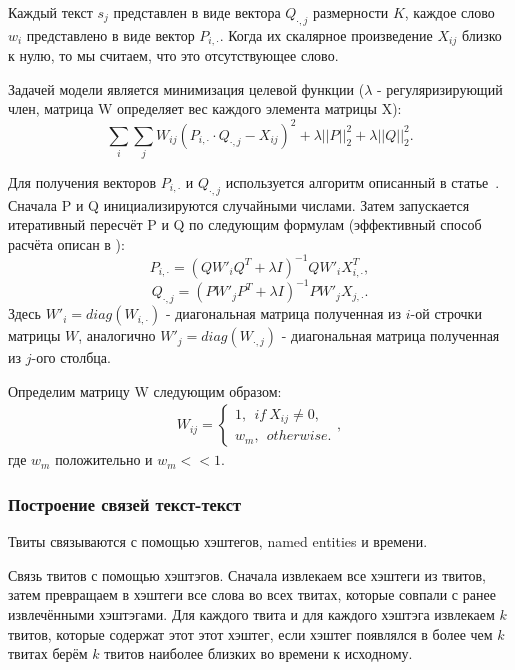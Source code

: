         Каждый текст $s_j$ представлен в виде вектора $Q_{\cdot,j}$ размерности $K$, каждое слово $w_i$ представлено в виде вектор $P_{i,\cdot}$. Когда их скалярное произведение $X_{ij}$ близко к нулю, то мы считаем, что это отсутствующее слово.

        Задачей модели является минимизация целевой функции ({\color{red}$\lambda$ - регуляризирующий член}, матрица W определяет вес каждого элемента матрицы X):
        $$\sum_i \sum_j W_{ij} (P_{i,\cdot} \cdot Q_{\cdot,j} - X_{ij})^2 + \lambda ||P||^2_2 + \lambda ||Q||^2_2.$$

        Для получения векторов $P_{i,\cdot}$ и $Q_{\cdot,j}$ используется алгоритм описанный в статье~\cite{matrix_approximation}. Сначала P и Q инициализируются случайными числами. Затем запускается итеративный пересчёт P и Q по следующим формулам (эффективный способ расчёта описан в \cite{steck_recommender}):
        $$P_{i, \cdot} = (Q W'_i Q^T + \lambda I)^{-1} Q W'_i X_{i,\cdot}^T,$$
        $$Q_{\cdot, j} = (P W'_j P^T + \lambda I)^{-1} P W'_j X_{j,\cdot}.$$
        Здесь $W'_i = diag(W_{i, \cdot})$ - диагональная матрица полученная из $i$-ой строчки матрицы $W$, аналогично $W'_j = diag(W_{\cdot, j})$ - диагональная матрица полученная из $j$-ого столбца.

        Определим матрицу W следующим образом:
        \begin{gather}
            W_{ij} =
            \begin{cases}
                1, ~~if~X_{ij} \neq 0, \nonumber \\
                w_m, ~~otherwise.
            \end{cases},
        \end{gather}
        где $w_m$ положительно и $w_m << 1$.

    \subsubsection{Построение связей текст-текст}
        Твиты связываются с помощью хэштегов, named entities и времени.

        Связь твитов с помощью хэштэгов. Сначала извлекаем все хэштеги из твитов, затем превращаем в хэштеги все слова во всех твитах, которые совпали с ранее извлечёнными хэштэгами. Для каждого твита и для каждого хэштэга извлекаем $k$ твитов, которые содержат этот этот хэштег, если хэштег появлялся в более чем $k$ твитах берём $k$ твитов наиболее близких во времени к исходному.

